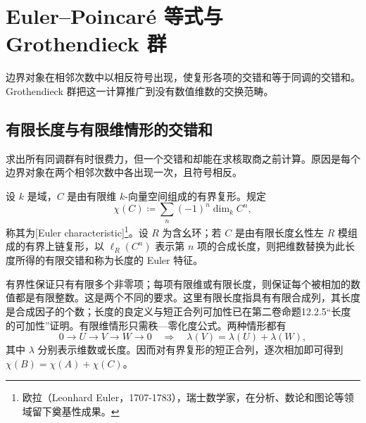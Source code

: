 
\section{Euler–Poincaré 等式与 Grothendieck 群}
\label{b4:sec:0504}

边界对象在相邻次数中以相反符号出现，使复形各项的交错和等于同调的交错和。Grothendieck 群把这一计算推广到没有数值维数的交换范畴。

%
%
%

\subsection{有限长度与有限维情形的交错和}
\label{b4:subsec:0504:01}

求出所有同调群有时很费力，但一个交错和却能在求核取商之前计算。原因是每个边界对象在两个相邻次数中各出现一次，且符号相反。

\begin{definition}\label{b4:def:euler-characteristic}
	设 \(k\) 是域，\(C\) 是由有限维 \(k\)-向量空间组成的有界复形。规定
	\[
		\chi(C)\coloneqq\sum_n(-1)^n\dim_k C^n,
	\]
	称其为[Euler characteristic]\footnote{欧拉（Leonhard Euler，1707-1783），瑞士数学家，在分析、数论和图论等领域留下奠基性成果。}。设 \(R\) 为含幺环；若 \(C\) 是由有限长度幺性左 \(R\) 模组成的有界上链复形，以 \(\ell_R(C^n)\) 表示第 \(n\) 项的合成长度，则把维数替换为此长度所得的有限交错和称为长度的 Euler 特征。
\end{definition}

有界性保证只有有限多个非零项；每项有限维或有限长度，则保证每个被相加的数值都是有限整数。这是两个不同的要求。这里有限长度指具有有限合成列，其长度是合成因子的个数；长度的良定义与短正合列可加性已在第二卷命题12.2.5“长度的可加性”证明。有限维情形只需秩—零化度公式。两种情形都有
\[
	0\to U\to V\to W\to0 \quad\Longrightarrow\quad \lambda(V)=\lambda(U)+\lambda(W),
\]
其中 \(\lambda\) 分别表示维数或长度。因而对有界复形的短正合列，逐次相加即可得到 \(\chi(B)=\chi(A)+\chi(C)\)。

